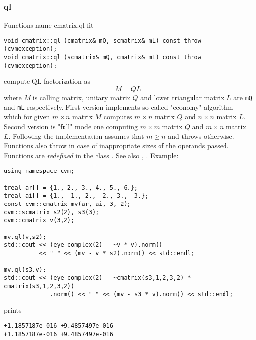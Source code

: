 \subsubsection{ql}
Functions%
\pdfdest name {cmatrix.ql} fit
\begin{verbatim}
void cmatrix::ql (cmatrix& mQ, scmatrix& mL) const throw (cvmexception);
void cmatrix::ql (scmatrix& mQ, cmatrix& mL) const throw (cvmexception);
\end{verbatim}
compute QL factorization as
\begin{equation*}
M=QL
\end{equation*}
where 
$M$ is  calling matrix, unitary matrix $Q$ 
and lower triangular matrix $L$ are \verb"mQ" and \verb"mL"
respectively. First version implements so-called "economy" algorithm
which for  given $m\times n$ matrix $M$ computes $m\times n$ matrix $Q$
and $n\times n$ matrix $L$. Second version is  "full" mode one
computing $m\times m$ matrix $Q$ and $m\times n$ matrix $L$.
Following 
the implementation assumes that $m\ge n$ and throws 
otherwise.
Functions also throw
in case of inappropriate sizes of the operands passed.
Functions are \emph{redefined} in the class
.
See also ,
.
Example:
\begin{Verbatim}
using namespace cvm;

treal ar[] = {1., 2., 3., 4., 5., 6.};
treal ai[] = {1., -1., 2., -2., 3., -3.};
const cvm::cmatrix mv(ar, ai, 3, 2);
cvm::scmatrix s2(2), s3(3);
cvm::cmatrix v(3,2);

mv.ql(v,s2);
std::cout << (eye_complex(2) - ~v * v).norm()
          << " " << (mv - v * s2).norm() << std::endl;

mv.ql(s3,v);
std::cout << (eye_complex(2) - ~cmatrix(s3,1,2,3,2) * cmatrix(s3,1,2,3,2))
             .norm() << " " << (mv - s3 * v).norm() << std::endl;
\end{Verbatim}
prints
\begin{Verbatim}
+1.1857187e-016 +9.4857497e-016
+1.1857187e-016 +9.4857497e-016
\end{Verbatim}
\newpage




